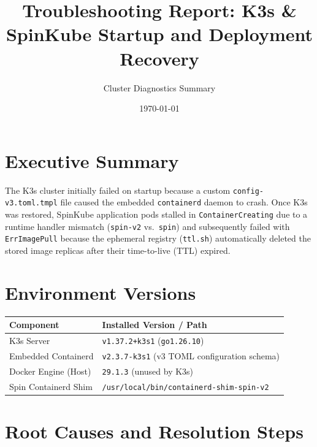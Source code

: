 \documentclass[11pt,a4paper]{article}
\title{\textbf{Troubleshooting Report: K3s \& SpinKube Startup and Deployment Recovery}}
\author{Cluster Diagnostics Summary}
\date{\today}
\begin{document}
    \maketitle

    \section*{Executive Summary}
    The K3s cluster initially failed on startup because a custom \texttt{config-v3.toml.tmpl} file caused the embedded \texttt{containerd} daemon to crash. Once K3s was restored, SpinKube application pods stalled in \texttt{ContainerCreating} due to a runtime handler mismatch (\texttt{spin-v2} vs.\ \texttt{spin}) and subsequently failed with \texttt{ErrImagePull} because the ephemeral registry (\texttt{ttl.sh}) automatically deleted the stored image replicas after their time-to-live (TTL) expired.

    \section{Environment Versions}\label{sec:environment-versions}
    \begin{table}[h!]
        \centering
        \begin{tabular}{@{}ll@{}}
            \toprule
            \textbf{Component} & \textbf{Installed Version / Path} \\ \midrule
            K3s Server & \texttt{v1.37.2+k3s1} (\texttt{go1.26.10}) \\
            Embedded Containerd & \texttt{v2.3.7-k3s1} (v3 TOML configuration schema) \\
            Docker Engine (Host) & \texttt{29.1.3} (unused by K3s) \\
            Spin Containerd Shim & \texttt{/usr/local/bin/containerd-shim-spin-v2} \\ \bottomrule
        \end{tabular}\label{tab:table}
    \end{table}

    \section{Root Causes and Resolution Steps}\label{sec:root-causes-and-resolution-steps}
\end{document}
